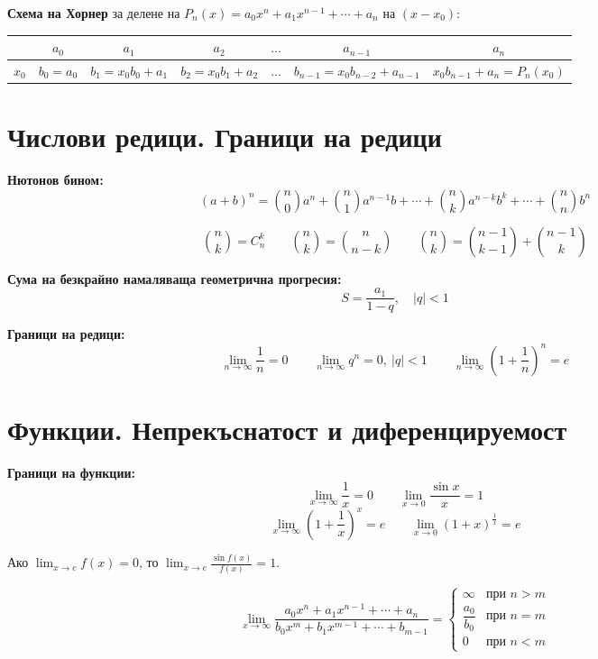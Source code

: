 \documentclass[12pt,a4paper]{article}
\begin{document}
\textbf{Схема на Хорнер} за делене на $P_n(x)=a_0x^n+a_1x^{n-1}+\cdots+a_n$ на $(x-x_0)$:

\begin{center}
\renewcommand{\arraystretch}{1.6}
\begin{tabular}{l*{6}{c}}
\toprule
 & $a_0$ & $a_1$ & $a_2$ & $\ldots$ & $a_{n-1}$ & $a_n$ \\
\midrule
$x_0$ & $b_0{=}a_0$ & $b_1{=}x_0b_0{+}a_1$ & $b_2{=}x_0b_1{+}a_2$ & $\ldots$ & $b_{n-1}{=}x_0b_{n-2}{+}a_{n-1}$ & $x_0b_{n-1}{+}a_n{=}P_n(x_0)$ \\
\bottomrule
\end{tabular}
\end{center}

\section{Числови редици. Граници на редици}

\textbf{Нютонов бином:}
$$(a+b)^n=\binom{n}{0}a^n+\binom{n}{1}a^{n-1}b+\cdots+\binom{n}{k}a^{n-k}b^k+\cdots+\binom{n}{n}b^n$$

$$\binom{n}{k}=C_n^k \qquad \binom{n}{k}=\binom{n}{n-k} \qquad \binom{n}{k}=\binom{n-1}{k-1}+\binom{n-1}{k}$$

\textbf{Сума на безкрайно намаляваща геометрична прогресия:}
$$S=\frac{a_1}{1-q},\quad |q|<1$$

\textbf{Граници на редици:}
$$\lim_{n\to\infty}\frac1n=0 \qquad \lim_{n\to\infty}q^n=0,\ |q|<1 \qquad \lim_{n\to\infty}\left(1+\frac1n\right)^n=e$$

\section{Функции. Непрекъснатост и диференцируемост}

\textbf{Граници на функции:}
$$\lim_{x\to\infty}\frac1x=0 \qquad \lim_{x\to0}\frac{\sin x}{x}=1$$
$$\lim_{x\to\infty}\left(1+\frac1x\right)^x=e \qquad \lim_{x\to0}(1+x)^{\frac1x}=e$$

Ако $\displaystyle\lim_{x\to c}f(x)=0$, то $\displaystyle\lim_{x\to c}\frac{\sin f(x)}{f(x)}=1$.

$$\lim_{x\to\infty}\frac{a_0x^n+a_1x^{n-1}+\cdots+a_n}{b_0x^m+b_1x^{m-1}+\cdots+b_{m-1}}=
\begin{cases}
\infty & \text{при } n>m \\[4pt]
\dfrac{a_0}{b_0} & \text{при } n=m \\[4pt]
0 & \text{при } n<m
\end{cases}$$
\end{document}
